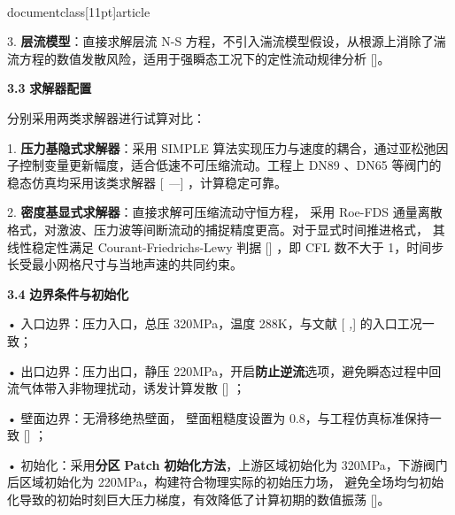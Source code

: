 \\documentclass[11pt]{article}
\begin{document}
3.  \textbf{层流模型}：直接求解层流 N-S 方程，不引入湍流模型假设，从根源上消除了湍流方程的数值发散风险，适用于强瞬态工况下的定性流动规律分析 [\cite{fe880629_9ce4_4876_a173_e24a97d827f4_基于数字孪生的管道阀门监测技术研究_谭宗豪}]。\par

\par
\textbf{3.3    }\textbf{求解器配置}\par

分别采用两类求解器进行试算对比：\par

1.  \textbf{压力基隐式求解器}：采用 SIMPLE 算法实现压力与速度的耦合，通过亚松弛因子控制变量更新幅度，适合低速不可压缩流动。工程上 DN89 、DN65 等阀门的稳态仿真均采用该类求解器 [ \textit{—}] ，计算稳定可靠。\par

\par
2.  \textbf{密度基显式求解器}：直接求解可压缩流动守恒方程， 采用 Roe-FDS 通量离散格式，对激波、压力波等间断流动的捕捉精度更高。对于显式时间推进格式， 其线性稳定性满足 Courant-Friedrichs-Lewy 判据 [\cite{fe880629_9ce4_4876_a173_e24a97d827f4_基于数字孪生的管道阀门监测技术研究_谭宗豪}] ，即 CFL 数不大于 1，时间步长受最小网格尺寸与当地声速的共同约束。\par

\par
\textbf{3.4    }\textbf{边界条件与初始化}\par

•  入口边界：压力入口，总压 320MPa，温度 288K，与文献 [ \textit{,}]  的入口工况一致；\par

•  出口边界：压力出口，静压 220MPa，开启\textbf{防止逆流}选项，避免瞬态过程中回流气体带入非物理扰动，诱发计算发散 [\cite{fe880629_9ce4_4876_a173_e24a97d827f4_基于数字孪生的管道阀门监测技术研究_谭宗豪}] ；\par

•  壁面边界：无滑移绝热壁面， 壁面粗糙度设置为 0.8，与工程仿真标准保持一致 [\cite{fe880629_9ce4_4876_a173_e24a97d827f4_基于数字孪生的管道阀门监测技术研究_谭宗豪}] ；\par

•  初始化：采用\textbf{分区} \textbf{Patch}\textbf{ }\textbf{初始化方法}，上游区域初始化为 320MPa，下游阀门后区域初始化为 220MPa，构建符合物理实际的初始压力场， 避免全场均匀初始化导致的初始时刻巨大压力梯度，有效降低了计算初期的数值振荡 [\cite{fe880629_9ce4_4876_a173_e24a97d827f4_基于数字孪生的管道阀门监测技术研究_谭宗豪}]。\par
\end{document}

